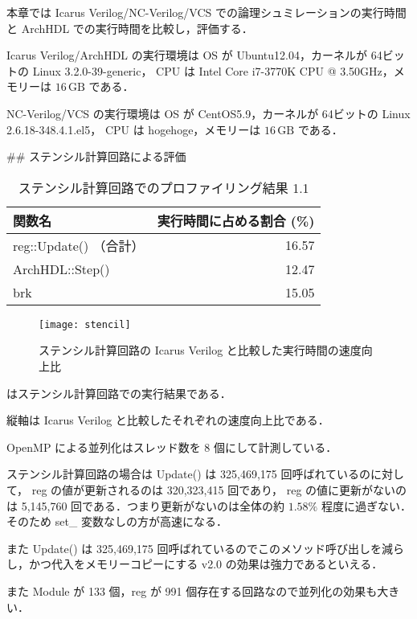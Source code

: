 本章では Icarus Verilog/NC-Verilog/VCS での論理シュミレーションの実行時間と
ArchHDL での実行時間を比較し，評価する．

Icarus Verilog/ArchHDL の実行環境は OS が Ubuntu12.04，カーネルが 64ビットの
Linux 3.2.0-39-generic， CPU は
Intel Core i7-3770K CPU @ 3.50GHz，メモリーは
$16\,\mathrm{GB}$ である．

NC-Verilog/VCS の実行環境は OS が CentOS5.9，カーネルが 64ビットの
Linux 2.6.18-348.4.1.el5， CPU は
hogehoge，メモリーは
$16\,\mathrm{GB}$ である．


## ステンシル計算回路による評価

\begin{table}[t]
 \caption{ステンシル計算回路でのプロファイリング結果 1.1}
 \label{table:stencil_prof1.1}
 \begin{center}
  \begin{tabular}{lr} \toprule
  関数名 & 実行時間に占める割合 (\%) \\ \midrule
  reg::Update() （合計） & 16.57 \\
  ArchHDL::Step() & 12.47 \\
  brk & 15.05 \\ \bottomrule
  \end{tabular}
 \end{center}
\end{table}
\fi


\begin{figure}[t]
 \centering
 \texttt{[image: stencil]}
 \caption{ステンシル計算回路の Icarus Verilog と比較した実行時間の速度向上比}
 \label{fig:stencil}
\end{figure}

 はステンシル計算回路での実行結果である．

縦軸は Icarus Verilog と比較したそれぞれの速度向上比である．

OpenMP による並列化はスレッド数を 8 個にして計測している．

ステンシル計算回路の場合は Update() は 325,469,175 回呼ばれているのに対して，
reg の値が更新されるのは 320,323,415 回であり，
reg の値に更新がないのは 5,145,760 回である．つまり更新がないのは全体の約
$1.58\%$ 程度に過ぎない．そのため set_ 変数なしの方が高速になる．

また Update() は 325,469,175 回呼ばれているのでこのメソッド呼び出しを減らし，かつ代入をメモリーコピーにする v2.0 の効果は強力であるといえる．

また Module が 133 個，reg が 991 個存在する回路なので並列化の効果も大きい．


